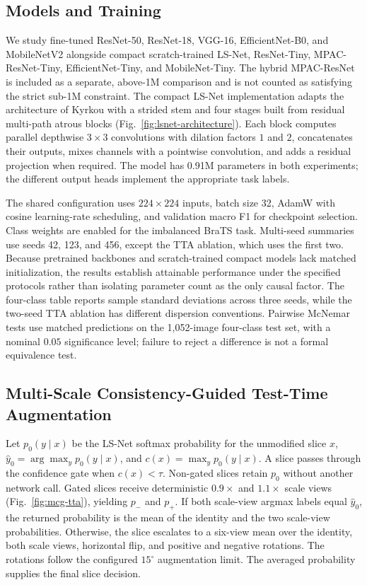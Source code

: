 \subsection{Models and Training}
We study fine-tuned ResNet-50, ResNet-18, VGG-16, EfficientNet-B0, and MobileNetV2 alongside compact scratch-trained LS-Net, ResNet-Tiny, MPAC-ResNet-Tiny, EfficientNet-Tiny, and MobileNet-Tiny. The hybrid MPAC-ResNet is included as a separate, above-1M comparison and is not counted as satisfying the strict sub-1M constraint. The compact LS-Net implementation adapts the architecture of Kyrkou \cite{kyrkou2026} with a strided stem and four stages built from residual multi-path atrous blocks (Fig.~\ref{fig:lsnet-architecture}). Each block computes parallel depthwise $3\times3$ convolutions with dilation factors $1$ and $2$, concatenates their outputs, mixes channels with a pointwise convolution, and adds a residual projection when required. The model has 0.91M parameters in both experiments; the different output heads implement the appropriate task labels.

The shared configuration uses $224\times224$ inputs, batch size 32, AdamW with cosine learning-rate scheduling, and validation macro F1 for checkpoint selection. Class weights are enabled for the imbalanced BraTS task. Multi-seed summaries use seeds 42, 123, and 456, except the TTA ablation, which uses the first two. Because pretrained backbones and scratch-trained compact models lack matched initialization, the results establish attainable performance under the specified protocols rather than isolating parameter count as the only causal factor. The four-class table reports sample standard deviations across three seeds, while the two-seed TTA ablation has different dispersion conventions. Pairwise McNemar tests \cite{mcnemar1947} use matched predictions on the 1,052-image four-class test set, with a nominal $0.05$ significance level; failure to reject a difference is not a formal equivalence test.

\subsection{Multi-Scale Consistency-Guided Test-Time Augmentation}
Let $p_0(y\mid x)$ be the LS-Net softmax probability for the unmodified slice $x$, $\hat y_0=\arg\max_y p_0(y\mid x)$, and $c(x)=\max_y p_0(y\mid x)$. A slice passes through the confidence gate when $c(x)<\tau$. Non-gated slices retain $p_0$ without another network call. Gated slices receive deterministic $0.9\times$ and $1.1\times$ scale views (Fig.~\ref{fig:mcg-tta}), yielding $p_-$ and $p_+$. If both scale-view argmax labels equal $\hat y_0$, the returned probability is the mean of the identity and the two scale-view probabilities. Otherwise, the slice escalates to a six-view mean over the identity, both scale views, horizontal flip, and positive and negative rotations. The rotations follow the configured $15^\circ$ augmentation limit. The averaged probability supplies the final slice decision.

